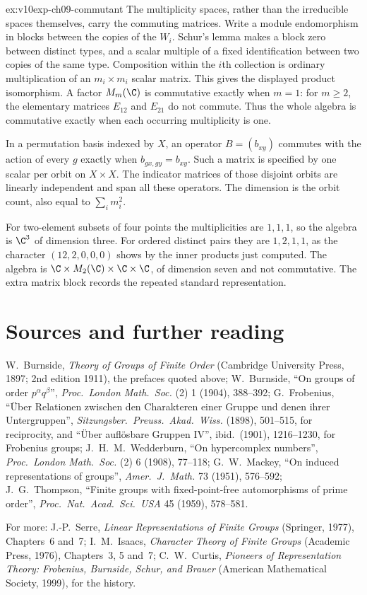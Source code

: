 \begin{solution}{ex:v10exp-ch09-commutant}
\idea The multiplicity spaces, rather than the irreducible spaces themselves, carry the commuting matrices.
\writeup Write a module endomorphism in blocks between the copies of the $W_i$. Schur's lemma makes a block zero between distinct types, and a scalar multiple of a fixed identification between two copies of the same type. Composition within the $i$th collection is ordinary multiplication of an $m_i\times m_i$ scalar matrix. This gives the displayed product isomorphism. A factor $M_m(\C)$ is commutative exactly when $m=1$: for $m\ge2$, the elementary matrices $E_{12}$ and $E_{21}$ do not commute. Thus the whole algebra is commutative exactly when each occurring multiplicity is one.

In a permutation basis indexed by $X$, an operator $B=(b_{xy})$ commutes with the action of every $g$ exactly when $b_{gx,gy}=b_{xy}$. Such a matrix is specified by one scalar per orbit on $X\times X$. The indicator matrices of those disjoint orbits are linearly independent and span all these operators. The dimension is the orbit count, also equal to $\sum_i m_i^2$.

For two-element subsets of four points the multiplicities are $1,1,1$, so the algebra is $\C^3$ of dimension three. For ordered distinct pairs they are $1,2,1,1$, as the character $(12,2,0,0,0)$ shows by the inner products just computed. The algebra is $\C\times M_2(\C)\times\C\times\C$, of dimension seven and not commutative. The extra matrix block records the repeated standard representation.
\end{solution}

\section*{Sources and further reading}

W.~Burnside, \emph{Theory of Groups of Finite Order} (Cambridge University Press, 1897; 2nd edition 1911), the prefaces quoted above; W.~Burnside, ``On groups of order $p^\alpha q^\beta$'', \emph{Proc.\ London Math.\ Soc.} (2) 1
(1904), 388--392; G.~Frobenius, ``Über Relationen zwischen den Charakteren einer Gruppe und denen ihrer Untergruppen'', \emph{Sitzungsber.\ Preuss.\ Akad.\ Wiss.} (1898), 501--515, for reciprocity, and ``Über auflösbare Gruppen
IV'', ibid.\ (1901), 1216--1230, for Frobenius groups; J.~H.~M.~Wedderburn, ``On hypercomplex numbers'', \emph{Proc.\ London Math.\ Soc.} (2) 6 (1908), 77--118; G.~W.~Mackey, ``On induced representations of groups'', \emph{Amer.\ J.\ Math.} 73
(1951), 576--592; J.~G.~Thompson, ``Finite groups with fixed-point-free automorphisms of prime order'', \emph{Proc.\ Nat.\ Acad.\ Sci.\ USA} 45 (1959), 578--581.

For more: J.-P.~Serre, \emph{Linear Representations of Finite Groups} (Springer, 1977), Chapters~6 and~7; I.~M.~Isaacs, \emph{Character Theory of Finite Groups} (Academic Press, 1976), Chapters~3, 5 and~7; C.~W.~Curtis,
\emph{Pioneers of Representation Theory: Frobenius, Burnside, Schur, and Brauer} (American Mathematical Society, 1999), for the history.

